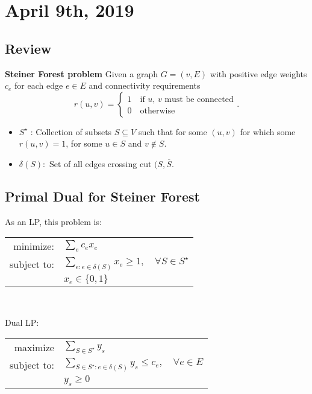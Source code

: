 \documentclass[../main/main.tex]{subfiles}
\begin{document}
\section{April  9th, 2019}
\subsection*{Review}

\textbf{Steiner Forest problem} Given a graph $G=(v,E)$ with positive edge weights $c_e$ for each edge $e\in E$ and connectivity requirements \[
	r(u,v) = \begin{cases}
		1 \quad \text{if $u$, $v$ must be connected}\\ 0 \quad \text{otherwise}
	\end{cases}
.\] 





\begin{itemize}
	\item 
$S^{\star}$ : Collection of subsets $S\subseteq V$ such that for some $(u,v)$ for which some $r(u,v)=1$, for some $u\in S$ and $v\not\in  S$.
\item 
$\delta(S):$ Set of all edges crossing cut $(S,\overline{S}$.
\end{itemize}

\subsection{Primal Dual for Steiner Forest}
As an LP, this problem is: \\

\begin{centering}
	
\begin{tabular}{rl}
	minimize: &$\sum\limits_e c_e x_e$\\
	subject to: & $\sum\limits_{e:e\in \delta(S)} x_e\ge 1,\quad \forall  S\in S^{\star}$\\
				& $x_e\in \{0,1\} $
\end{tabular}\\
\end{centering}

Dual LP: \\

\begin{centering}
\begin{tabular}{rl}
	maximize& $\sum\limits_{S\in S^{\star}} y_s$\\
	subject to: & $\sum\limits_{S\in S^{\star}:e\in \delta(S)} y_s \le c_e,\quad \forall e\in E$\\
				& $y_s\ge 0$
\end{tabular}\\
	\end{centering}
\end{document}
